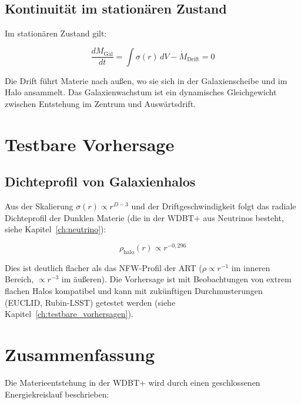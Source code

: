\subsection{Kontinuität im stationären Zustand}
\label{sub:materieentstehung_kontinuitaet}

Im stationären Zustand gilt:

\[
\frac{dM_{\text{Gal}}}{dt} = \int \sigma(r) \, dV - \dot{M}_{\text{Drift}} = 0
\]

Die Drift führt Materie nach außen, wo sie sich in der Galaxienscheibe und im Halo ansammelt. Das Galaxienwachstum ist ein dynamisches Gleichgewicht zwischen Entstehung im Zentrum und Auswärtsdrift.

\section{Testbare Vorhersage}
\label{app:materieentstehung_vorhersage}

\subsection{Dichteprofil von Galaxienhalos}
\label{sub:materieentstehung_halo}

Aus der Skalierung \( \sigma(r) \propto r^{D-3} \) und der Driftgeschwindigkeit folgt das radiale Dichteprofil der Dunklen Materie (die in der WDBT+ aus Neutrinos besteht, siehe Kapitel~\ref{ch:neutrino}):

\[
\boxed{\rho_{\text{halo}}(r) \propto r^{-0,296}}
\]

Dies ist deutlich flacher als das NFW-Profil der ART (\( \rho \propto r^{-1} \) im inneren Bereich, \( \propto r^{-3} \) im äußeren). Die Vorhersage ist mit Beobachtungen von extrem flachen Halos kompatibel und kann mit zukünftigen Durchmusterungen (EUCLID, Rubin-LSST) getestet werden (siehe Kapitel~\ref{ch:testbare_vorhersagen}).

\section{Zusammenfassung}
\label{app:materieentstehung_zusammenfassung}

Die Materieentstehung in der WDBT+ wird durch einen geschlossenen Energiekreislauf beschrieben:

